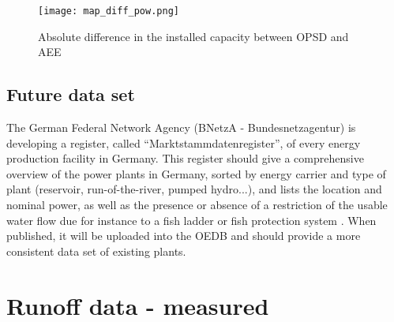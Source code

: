 \begin{figure}[H]
\centering
\texttt{[image: map\_diff\_pow.png]}
\caption[Absolute difference in the installed capacity between OPSD and AEE]{Absolute difference in the installed capacity between OPSD and AEE}
\label{map_diff_pow}
\end{figure}


\subsection{Future data set}

The German Federal Network Agency (BNetzA - Bundesnetzagentur) is developing a register, called ``Marktstammdatenregister'', of every energy production facility in Germany. This register should give a comprehensive overview of the power plants in Germany, sorted by energy carrier and type of plant (reservoir, run-of-the-river, pumped hydro...), and lists the location and nominal power, as well as the presence or absence of a restriction of the usable water flow due for instance to a fish ladder or fish protection system \cite{MaStR}. \newline
When published, it will be uploaded into the OEDB and should provide a more consistent data set of existing plants.

\section{Runoff data - measured}

\label{sec:meas_runoff}

